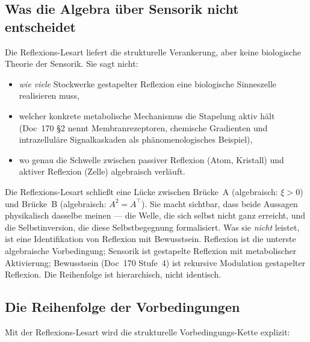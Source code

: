\subsection{Was die Algebra über Sensorik nicht entscheidet}\label{sec:reflexion_grenze}

Die Reflexions-Lesart liefert die strukturelle Verankerung, aber keine biologische Theorie der Sensorik. Sie sagt nicht:

\begin{itemize}
\item \emph{wie viele} Stockwerke gestapelter Reflexion eine biologische Sinneszelle realisieren muss,
\item welcher konkrete metabolische Mechanismus die Stapelung aktiv hält (Doc~170 \S2 nennt Membranrezeptoren, chemische Gradienten und intrazelluläre Signalkaskaden als phänomenologisches Beispiel),
\item wo genau die Schwelle zwischen \glqq passiver Reflexion\grqq{} (Atom, Kristall) und \glqq aktiver Reflexion\grqq{} (Zelle) algebraisch verläuft.
\end{itemize}

\begin{interpretation}
Die Reflexions-Lesart schließt eine Lücke zwischen Brücke~A (algebraisch: $\xi > 0$) und Brücke~B (algebraisch: $A^2 = A^\top$). Sie macht sichtbar, dass beide Aussagen physikalisch dasselbe meinen --- die Welle, die sich selbst nicht ganz erreicht, und die Selbstinversion, die diese Selbstbegegnung formalisiert. Was sie \emph{nicht} leistet, ist eine Identifikation von Reflexion mit Bewusstsein. Reflexion ist die unterste algebraische Vorbedingung; Sensorik ist gestapelte Reflexion mit metabolischer Aktivierung; Bewusstsein (Doc~170 Stufe~4) ist rekursive Modulation gestapelter Reflexion. Die Reihenfolge ist hierarchisch, nicht identisch.
\end{interpretation}

\subsection{Die Reihenfolge der Vorbedingungen}\label{sec:reflexion_reihenfolge}

Mit der Reflexions-Lesart wird die strukturelle Vorbedingungs-Kette explizit:

